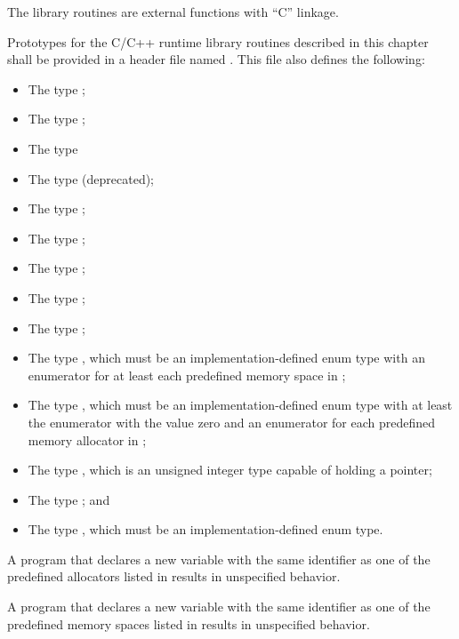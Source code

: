 \begin{ccppspecific}
The library routines are external functions with ``C'' linkage.

Prototypes for the C/C++ runtime library routines described in this 
chapter shall be provided in a header file named . This 
file also defines the following:

\begin{itemize}
\item The type ;
\item The type ;
\item The type 
\item The type  (deprecated);
\item The type ;
\item The type ;
\item The type ;
\item The type ;
\item The type ;
\item The type , which must be an 
      implementation-defined enum type with an enumerator for 
      at least each predefined memory space in 
      ;
\item The type , which must be an
      implementation-defined enum type with at least the 
       enumerator with the value 
      zero and an enumerator for each predefined memory allocator 
      in ;
\item The type , which is an unsigned integer type 
      capable of holding a pointer;
\item The type ; and
\item The type , which must be an 
      implementation-defined enum type.
\end{itemize}

A program that declares a new variable with the same identifier as one of 
the predefined allocators listed in  
results in unspecified behavior.

A program that declares a new variable with the same identifier as one of 
the predefined memory spaces listed in  
results in unspecified behavior.
\end{ccppspecific}

